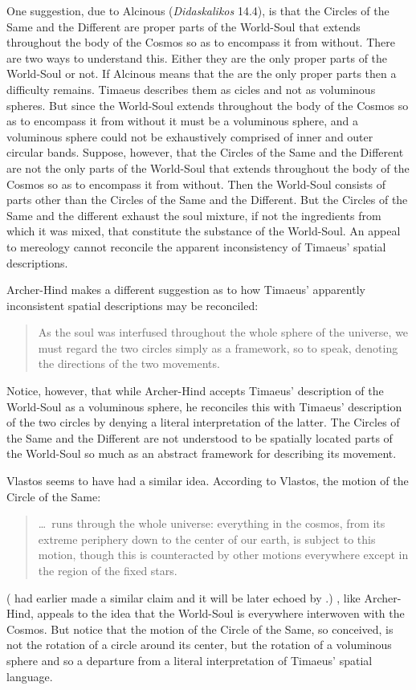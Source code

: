One suggestion, due to Alcinous (\emph{Didaskalikos} 14.4), is that the Circles of the Same and the Different are proper parts of the World-Soul that extends throughout the body of the Cosmos so as to encompass it from without. There are two ways to understand this. Either they are the only proper parts of the World-Soul or not. If Alcinous means that the are the only proper parts then a difficulty remains. Timaeus describes them as cicles and not as voluminous spheres. But since the World-Soul extends throughout the body of the Cosmos so as to encompass it from without it must be a voluminous sphere, and a voluminous sphere could not be exhaustively comprised of inner and outer circular bands. Suppose, however, that the Circles of the Same and the Different are not the only parts of the World-Soul that extends throughout the body of the Cosmos so as to encompass it from without. Then the World-Soul consists of parts other than the Circles of the Same and the Different. But the Circles of the Same and the different exhaust the soul mixture, if not the ingredients from which it was mixed, that constitute the substance of the World-Soul. An appeal to mereology cannot reconcile the apparent inconsistency of Timaeus' spatial descriptions.

Archer-Hind makes a different suggestion as to how Timaeus' apparently inconsistent spatial descriptions may be reconciled:
\begin{quote}
	As the soul was interfused throughout the whole sphere of the universe, we must regard the two circles simply as a framework, so to speak, denoting the directions of the two movements. \citep[112 n2]{Archer-Hind:1888qd}
\end{quote}
Notice, however, that while Archer-Hind accepts Timaeus' description of the World-Soul as a voluminous sphere, he reconciles this with Timaeus' description of the two circles by denying a literal interpretation of the latter. The Circles of the Same and the Different are not understood to be spatially located parts of the World-Soul so much as an abstract framework for describing its movement. 

Vlastos seems to have had a similar idea. According to Vlastos, the motion of the Circle of the Same:
\begin{quote}
	\ldots\ runs through the whole universe: everything in the cosmos, from its extreme periphery down to the center of our earth, is subject to this motion, though this is counteracted by other motions everywhere except in the region of the fixed stars. \citep[32]{Vlastos:1975aa}
\end{quote}
(\citealt[76]{Cornford:1935fk} had earlier made a similar claim and it will be later echoed by \citealt[21--22 n26]{Zeyl:2000cs}.) \citet[32 n14]{Vlastos:1975aa}, like Archer-Hind, appeals to the idea that the World-Soul is everywhere interwoven with the Cosmos. But notice that the motion of the Circle of the Same, so conceived, is not the rotation of a circle around its center, but the rotation of a voluminous sphere and so a departure from a literal interpretation of Timaeus' spatial language. 

